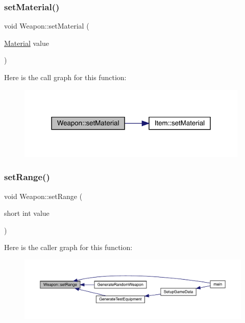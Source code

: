 \subsubsection{\texorpdfstring{set\+Material()}{setMaterial()}}
{\footnotesize\ttfamily void Weapon\+::set\+Material (\begin{DoxyParamCaption}\item[{\mbox{\hyperlink{class_material}{Material}}}]{value }\end{DoxyParamCaption})}

Here is the call graph for this function\+:
\nopagebreak
\begin{figure}[H]
\begin{center}
\leavevmode
\includegraphics[width=313pt]{db/de5/class_weapon_a2861d732a0cccff20a9ea29548d05702_cgraph}
\end{center}
\end{figure}
\mbox{\label{class_weapon_aa6f690fe5e69ce11628b245739c74dc5}} 
\subsubsection{\texorpdfstring{set\+Range()}{setRange()}}
{\footnotesize\ttfamily void Weapon\+::set\+Range (\begin{DoxyParamCaption}\item[{short int}]{value }\end{DoxyParamCaption})}

Here is the caller graph for this function\+:
\nopagebreak
\begin{figure}[H]
\begin{center}
\leavevmode
\includegraphics[width=350pt]{db/de5/class_weapon_aa6f690fe5e69ce11628b245739c74dc5_icgraph}
\end{center}
\end{figure}
\mbox{\label{class_weapon_a78e4b6c131a25e93f647594191bae38d}} 
